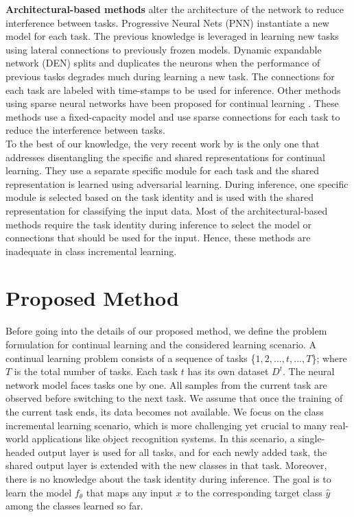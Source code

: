 \documentclass[letterpaper]{article} %
\begin{document}
\textbf{Architectural-based methods} alter the architecture of the network to reduce interference between tasks. Progressive Neural
Nets (PNN) instantiate a new model for each task. The previous knowledge is leveraged in learning new tasks using lateral connections to previously frozen models. Dynamic expandable network (DEN) \cite{yoon2018lifelong} splits and duplicates the neurons when the performance of previous tasks degrades much during learning a new task. The connections for each task are labeled with time-stamps to be used for inference. Other methods using sparse neural networks have been proposed for continual learning \cite{mallya2018piggyback,mallya2018packnet,sokar2020spacenet}. These methods use a fixed-capacity model and use sparse connections for each task to reduce the interference between tasks. \\
To the best of our knowledge, the very recent work by \cite{ebrahimi2020adversarial} is the only one that addresses disentangling the specific and shared representations for continual learning. They use a separate specific module for each task and the shared representation is learned using adversarial learning. During inference, one specific module is selected based on the task identity and is used with the shared representation for classifying the input data.
Most of the architectural-based methods require the task identity during inference to select the model or connections that should be used for the input. Hence, these methods are inadequate in class incremental learning.


\section{Proposed Method}
Before going into the details of our proposed method, we define the problem formulation for continual learning and the considered learning scenario. A continual learning problem consists of a sequence of tasks \{$1, 2,..., t,..., T$\}; where $T$ is the total number of tasks. Each task $t$ has its own dataset $D^{t}$. The neural network model faces tasks one by one. All samples from the current task are observed before switching to the next task. We assume that once the training of the current task ends, its data becomes not available. We focus on the class incremental learning scenario, which is more challenging yet crucial to many real-world applications like object recognition systems. In this scenario, a single-headed output layer is used for all tasks, and for each newly added task, the shared output layer is extended with the new classes in that task. Moreover, there is no knowledge about the task identity during inference. The goal is to learn the model $f_{\theta}$ that maps any input $x$ to the corresponding target class $\hat{y}$ among the classes learned so far.
\end{document}
